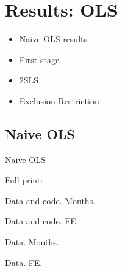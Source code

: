 \documentclass{beamer}
\begin{document}
%
%     
%
%    


\section{Results: OLS}
\begin{frame}
\begin{itemize}
\item Naive OLS results
\item First stage
\item 2SLS
\item Exclusion Restriction
\end{itemize}
\end{frame}


\subsection{Naive OLS}
\begin{frame}{Naive OLS}

Full print:

Data and code. Months.

Data and code. FE.

Data. Months.

Data. FE.
\end{frame}
\end{document}
